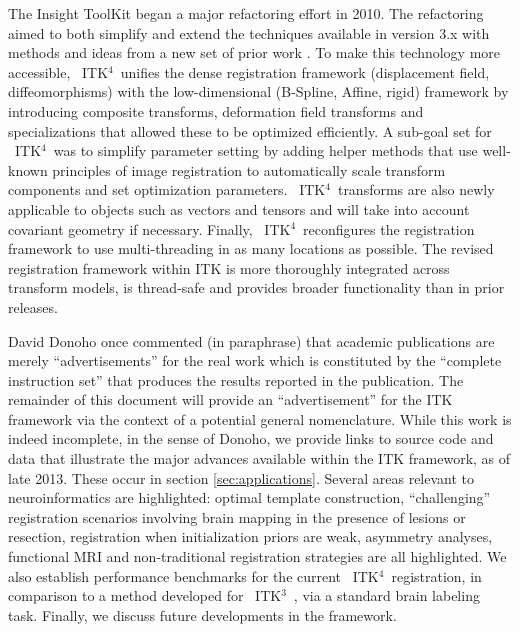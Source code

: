 \documentclass{frontiersSCNS}
\newcommand{\tk}{~ITK$^{\text{4}}$~}
\newcommand{\tkt}{~ITK$^{\text{3}}$~}
\begin{document}
The Insight ToolKit began a major refactoring effort in 2010.
The refactoring aimed to both simplify and extend the techniques available in version
3.x with methods and ideas from a new set of prior work
\cite{Jenkinson2001,Christensen1996,Rueckert1999,Miller2005,Peyrat2010,Avants2011}.
To make this technology more accessible, \tk unifies the dense
registration framework (displacement field, diffeomorphisms)
with the low-dimensional (B-Spline, Affine, rigid) framework by
introducing composite transforms, deformation field transforms and
specializations that allowed these to be optimized efficiently.  A sub-goal set for \tk was to simplify
parameter setting by adding helper methods that use well-known
principles of image registration to automatically scale transform
components and set optimization parameters.  \tk transforms are also
newly applicable to objects such as vectors and tensors and will take into account covariant geometry if
necessary.  Finally, \tk reconfigures the registration framework
to use multi-threading in as many locations as possible.
The revised registration framework within ITK is more thoroughly
integrated across transform models, is thread-safe and provides
broader functionality than in prior releases. 




David Donoho once commented (in paraphrase) that academic publications
are merely ``advertisements'' for the real work which is constituted
by the ``complete instruction set'' that produces the results reported
in the publication.  The remainder of this document will provide an
``advertisement'' for the ITK framework via the context of a potential
general nomenclature.  While this work is indeed incomplete, in the
sense of Donoho, we provide links to source code and data that
illustrate the major advances available within the ITK framework, as
of late 2013.  These occur in section \ref{sec:applications}.  Several
areas relevant to neuroinformatics are highlighted: optimal template
construction, ``challenging'' registration scenarios involving brain
mapping in the presence of lesions or resection, registration when
initialization priors are weak, asymmetry analyses, functional MRI and
non-traditional registration strategies are all highlighted.  We also
establish performance benchmarks for the current \tk registration, in
comparison to a method developed for \tkt, via
a standard brain labeling task.  Finally, we discuss future developments
in the framework.
\end{document}
